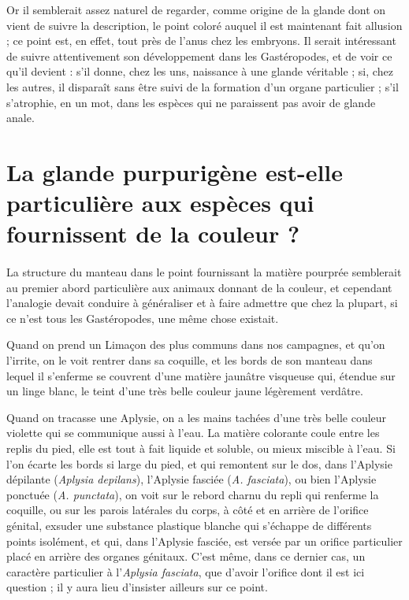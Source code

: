 \documentclass[a4paper, 11pt, oneside, polutonikogreek, french]{article}
\begin{document}
Or il semblerait assez naturel de regarder, comme origine de la glande dont on vient de suivre la description, le point coloré auquel il est maintenant fait allusion ; ce point est, en effet, tout près de l'anus chez les embryons. Il serait intéressant de suivre attentivement son développement dans les Gastéropodes, et de voir ce qu'il devient : s'il donne, chez les uns, naissance à une glande véritable ; si, chez les autres, il disparaît sans être suivi de la formation d'un organe particulier ; s'il s'atrophie, en un mot, dans les espèces qui ne paraissent pas avoir de glande anale.
\clearpage
\section{La glande purpurigène est-elle particulière aux espèces qui fournissent de la couleur ?}
\paragraph{}
La structure du manteau dans le point fournissant la matière pourprée semblerait au premier abord particulière aux animaux donnant de la couleur, et cependant l'analogie devait conduire à généraliser et à faire admettre que chez la plupart, si ce n'est tous les Gastéropodes, une même chose existait.

Quand on prend un Limaçon des plus communs dans nos campagnes, et qu'on l'irrite, on le voit rentrer dans sa coquille, et les bords de son manteau dans lequel il s'enferme se couvrent d'une matière jaunâtre visqueuse qui, étendue sur un linge blanc, le teint d'une très belle couleur jaune légèrement verdâtre.

Quand on tracasse une Aplysie, on a les mains tachées d'une très belle couleur violette qui se communique aussi à l'eau. La matière colorante coule entre les replis du pied, elle est tout à fait liquide et soluble, ou mieux miscible à l'eau. Si l'on écarte les bords si large du pied, et qui remontent sur le dos, dans l'Aplysie dépilante (\emph{Aplysia depilans}), l'Aplysie fasciée (\emph{A. fasciata}), ou bien l'Aplysie ponctuée (\emph{A. punctata}), on voit sur le rebord charnu du repli qui renferme la coquille, ou sur les parois latérales du corps, à côté et en arrière de l'orifice génital, exsuder une substance plastique blanche qui s'échappe de différents points isolément, et qui, dans l'Aplysie fasciée, est versée par un orifice particulier placé en arrière des organes génitaux. C'est même, dans ce dernier cas, un caractère particulier à l'\emph{Aplysia fasciata}, que d'avoir l'orifice dont il est ici question ; il y aura lieu d'insister ailleurs sur ce point.
\end{document}
